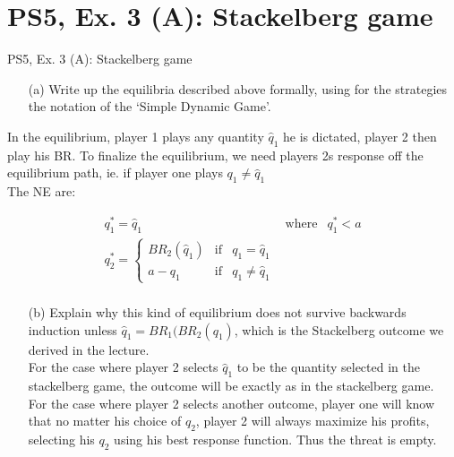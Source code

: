 \section{PS5, Ex. 3 (A): Stackelberg game}

\begin{frame}{PS5, Ex. 3 (A): Stackelberg game}
  \begin{multicols}{2}
    \begin{itemize}
      \item[(a)] Write up the equilibria described above formally, using for the strategies the notation of the ‘Simple Dynamic Game’.
    \end{itemize}

In the equilibrium, player 1 plays any quantity $\hat{q}_1$ he is dictated, player 2 then play his BR. To finalize the equilibrium, we need players 2s response off the equilibrium path, ie. if player one plays $q_1\neq\hat{q}_1$ \\

The NE are:

    \begin{align*}
    q_1^*=\hat{q}_1 & \text{where} & q_1^*<a \\
    q_2^*=\left\{ \begin{array}{lcl}
          BR_2(\hat{q}_1) & \text{if} & q_1=\hat{q}_1 \\
          a-q_1 & \text{if} & q_1\neq\hat{q}_1
                \end{array}\right. \\
    \end{align*}
    \vfill\null \columnbreak
    \begin{itemize}
      \item[(b)] Explain why this kind of equilibrium does not survive backwards induction unless $\hat{q}_1=BR_1(BR_2(q_1)$, which is the Stackelberg outcome we derived in the lecture. \\
      
     For the case where player 2 selects $\hat{q}_1$ to be the quantity selected in the stackelberg game, the outcome will be exactly as in the stackelberg game. \\
     For the case where player 2 selects another outcome, player one will know that no matter his choice of $q_2$, player 2 will always maximize his profits, selecting his $q_2$ using his best response function. Thus the threat is empty.
    \end{itemize}
    \vfill\null
  \end{multicols}
\end{frame}

